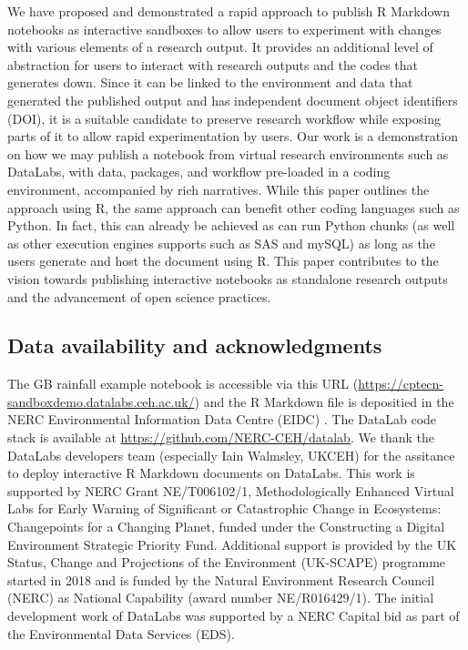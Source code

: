We have proposed and demonstrated a rapid approach to publish R Markdown
notebooks as interactive sandboxes to allow users to experiment with
changes with various elements of a research output. It provides an
additional level of abstraction for users to interact with research
outputs and the codes that generates down. Since it can be linked to the
environment and data that generated the published output and has
independent document object identifiers (DOI), it is a suitable
candidate to preserve research workflow while exposing parts of it to
allow rapid experimentation by users. Our work is a demonstration on how
we may publish a notebook from virtual research environments such as
DataLabs, with data, packages, and workflow pre-loaded in a coding
environment, accompanied by rich narratives. While this paper outlines
the approach using R, the same approach can benefit other coding
languages such as Python. In fact, this can already be achieved as
 can run Python chunks (as well as other execution
engines  supports such as SAS and mySQL) as long as the
users generate and host the document using R. This paper contributes to
the vision towards publishing interactive notebooks as standalone
research outputs and the advancement of open science practices.

\hypertarget{data-availability-and-acknowledgments}{%
\subsection{Data availability and
acknowledgments}\label{data-availability-and-acknowledgments}}

The GB rainfall example notebook is accessible via this URL
(\url{https://cptecn-sandboxdemo.datalabs.ceh.ac.uk/}) and the R
Markdown file is depositied in the NERC Environmental Information Data
Centre (EIDC) \citep{EIDC}. The DataLab code stack is available at
\url{https://github.com/NERC-CEH/datalab}. We thank the DataLabs
developers team (especially Iain Walmsley, UKCEH) for the assitance to
deploy interactive R Markdown documents on DataLabs. This work is
supported by NERC Grant NE/T006102/1, Methodologically Enhanced Virtual
Labs for Early Warning of Significant or Catastrophic Change in
Ecosystems: Changepoints for a Changing Planet, funded under the
Constructing a Digital Environment Strategic Priority Fund. Additional
support is provided by the UK Status, Change and Projections of the
Environment (UK-SCAPE) programme started in 2018 and is funded by the
Natural Environment Research Council (NERC) as National Capability
(award number NE/R016429/1). The initial development work of DataLabs
was supported by a NERC Capital bid as part of the Environmental Data
Services (EDS).

